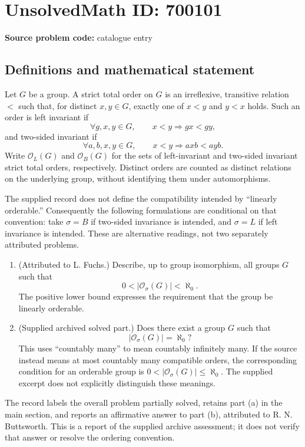 \documentclass[11pt]{article}
\begin{document}
\section*{UnsolvedMath ID: 700101}
\textbf{Source problem code:} catalogue entry
\subsection{Definitions and mathematical statement}
Let \(G\) be a group. A strict total order on \(G\) is an irreflexive, transitive relation \(<\) such that, for distinct \(x,y\in G\), exactly one of \(x<y\) and \(y<x\) holds. Such an order is left invariant if
\[
\forall g,x,y\in G,\qquad x<y\Longrightarrow gx<gy,
\]
and two-sided invariant if
\[
\forall a,b,x,y\in G,\qquad x<y\Longrightarrow axb<ayb.
\]
Write \(\mathcal O_L(G)\) and \(\mathcal O_B(G)\) for the sets of left-invariant and two-sided invariant strict total orders, respectively. Distinct orders are counted as distinct relations on the underlying group, without identifying them under automorphisms.

The supplied record does not define the compatibility intended by ``linearly orderable.'' Consequently the following formulations are conditional on that convention: take \(\sigma=B\) if two-sided invariance is intended, and \(\sigma=L\) if left invariance is intended. These are alternative readings, not two separately attributed problems.

\begin{enumerate}
\item[(a)] \textup{(Attributed to L. Fuchs.)} Describe, up to group isomorphism, all groups \(G\) such that
\[
0<\lvert\mathcal O_\sigma(G)\rvert<\aleph_0.
\]
The positive lower bound expresses the requirement that the group be linearly orderable.
\item[(b)] \textup{(Supplied archived solved part.)} Does there exist a group \(G\) such that
\[
\lvert\mathcal O_\sigma(G)\rvert=\aleph_0?
\]
This uses ``countably many'' to mean countably infinitely many. If the source instead means at most countably many compatible orders, the corresponding condition for an orderable group is \(0<\lvert\mathcal O_\sigma(G)\rvert\leq\aleph_0\). The supplied excerpt does not explicitly distinguish these meanings.
\end{enumerate}

The record labels the overall problem partially solved, retains part (a) in the main section, and reports an affirmative answer to part (b), attributed to R. N. Buttsworth. This is a report of the supplied archive assessment; it does not verify that answer or resolve the ordering convention.
\end{document}
